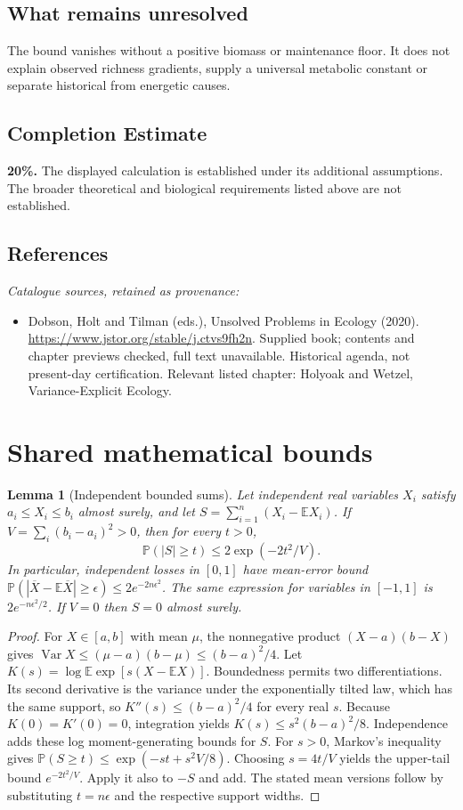 \documentclass[11pt]{article}
\newcommand{\E}{\mathbb E}
\newcommand{\Prob}{\mathbb P}
\DeclareMathOperator{\Var}{Var}
\providecommand{\E}{\mathbb E}
\providecommand{\Prob}{\mathbb P}
\providecommand{\Var}{\operatorname{Var}}
\newtheorem{sharedlemma}{Lemma}[section]
\begin{document}
\subsection{What remains unresolved}
The bound vanishes without a positive biomass or maintenance floor. It does not explain observed richness gradients, supply a universal metabolic constant or separate historical from energetic causes.
\subsection{Completion Estimate}
\textbf{20\%.} The displayed calculation is established under its additional assumptions. The broader theoretical and biological requirements listed above are not established.
\subsection{References}
\noindent\emph{Catalogue sources, retained as provenance:}
\begin{itemize}
\item Dobson, Holt and Tilman (eds.), Unsolved Problems in Ecology (2020). \url{https://www.jstor.org/stable/j.ctvs9fh2n}. Supplied book; contents and chapter previews checked, full text unavailable. Historical agenda, not present-day certification. Relevant listed chapter: Holyoak and Wetzel, Variance-Explicit Ecology.
\end{itemize}
\clearpage


\appendix
\section{Shared mathematical bounds}\label{app:bounds}
\begin{sharedlemma}[Independent bounded sums]\label{lem:bounded}
Let independent real variables $X_i$ satisfy $a_i\leq X_i\leq b_i$ almost surely,
and let $S=\sum_{i=1}^n(X_i-\E X_i)$. If
$V=\sum_i(b_i-a_i)^2>0$, then for every $t>0$,
\[
 \Prob(|S|\geq t)\leq 2\exp(-2t^2/V).
\]
In particular, independent losses in $[0,1]$ have mean-error bound
$\Prob(|\overline X-\E\overline X|\geq\epsilon)
\leq2e^{-2n\epsilon^2}$. The same expression for variables in $[-1,1]$
is $2e^{-n\epsilon^2/2}$. If $V=0$ then $S=0$ almost surely.
\end{sharedlemma}
\begin{proof}
For $X\in[a,b]$ with mean $\mu$, the nonnegative product
$(X-a)(b-X)$ gives
$\Var X\leq(\mu-a)(b-\mu)\leq(b-a)^2/4$.
Let $K(s)=\log\E\exp[s(X-\E X)]$.
Boundedness permits two differentiations. Its second derivative is the variance
under the exponentially tilted law, which has the same support, so
$K''(s)\leq(b-a)^2/4$ for every real $s$.
Because $K(0)=K'(0)=0$, integration yields
$K(s)\leq s^2(b-a)^2/8$.
Independence adds these log moment-generating bounds for $S$.
For $s>0$, Markov's inequality gives
$\Prob(S\geq t)\leq\exp(-st+s^2V/8)$.
Choosing $s=4t/V$ yields the upper-tail bound $e^{-2t^2/V}$.
Apply it also to $-S$ and add. The stated mean versions follow by substituting
$t=n\epsilon$ and the respective support widths.
\end{proof}
\end{document}
